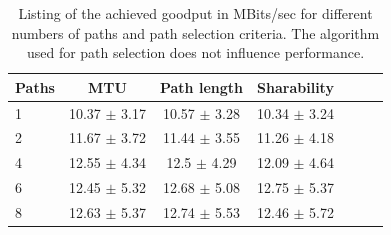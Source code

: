 \begin{table}
	\begin{center}
		\begin{tabular}{lcccccc}\toprule
			Paths & MTU & Path length & Sharability \\\midrule
			1  & 10.37 {\small $\pm$ 3.17} & 10.57 {\small $\pm$ 3.28} & 10.34 {\small $\pm$ 3.24} \\
			2  & 11.67 {\small $\pm$ 3.72} & 11.44 {\small $\pm$ 3.55} & 11.26 {\small $\pm$ 4.18} \\
			4  & 12.55 {\small $\pm$ 4.34} & 12.5  {\small $\pm$ 4.29} & 12.09 {\small $\pm$ 4.64} \\
			6  & 12.45 {\small $\pm$ 5.32} & 12.68 {\small $\pm$ 5.08} & 12.75 {\small $\pm$ 5.37} \\
			8  & 12.63 {\small $\pm$ 5.37} & 12.74 {\small $\pm$ 5.53} & 12.46 {\small $\pm$ 5.72} \\\bottomrule
		\end{tabular}
		\caption{Listing of the achieved goodput in MBits/sec for different numbers of paths and path selection criteria. The algorithm used for path selection does not influence performance.}
		\label{tab:InfluenceOfPathSelection}
	\end{center}
\end{table}

